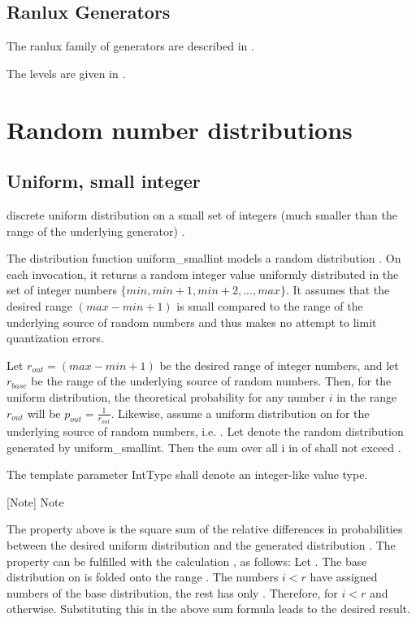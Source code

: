 \subsection{Ranlux Generators}
The ranlux family of generators are described in \cite{Luescher_1994}.

The levels are given in \cite{James_1994}.







\section{Random number distributions}
\label{RandomNumberDistributions}


\subsection{Uniform, small integer}
discrete uniform distribution on a small set of integers (much smaller than the range of the underlying generator) .

The distribution function uniform\_smallint models a random distribution . On each invocation, it returns a random integer value uniformly distributed in the set of integer numbers $\{min, min+1, min+2, ..., max\}$. It assumes that the desired range $(max-min+1)$ is small compared to the range of the underlying source of random numbers and thus makes no attempt to limit quantization errors.

Let $r_{out} = (max-min+1)$ be the desired range of integer numbers, and let $r_{base}$ be the range of the underlying source of random numbers. Then, for the uniform distribution, the theoretical probability for any number $i$ in the range $r_{out}$ will be $p_{out}=\frac{1}{r_{out}}$. Likewise, assume a uniform distribution on  for the underlying source of random numbers, i.e. . Let  denote the random distribution generated by uniform\_smallint. Then the sum over all i in  of  shall not exceed .

The template parameter IntType shall denote an integer-like value type.




[Note] 
Note


The property above is the square sum of the relative differences in probabilities between the desired uniform distribution  and the generated distribution . The property can be fulfilled with the calculation , as follows: Let . The base distribution on  is folded onto the range . The numbers $i < r$ have assigned  numbers of the base distribution, the rest has only . Therefore,  for $i < r$ and  otherwise. Substituting this in the above sum formula leads to the desired result. 




